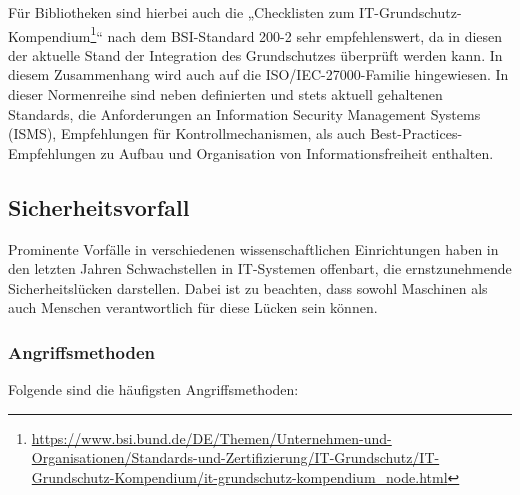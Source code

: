 \documentclass[
  11pt,
  letterpaper,
  DIV=11,
  twoside]{scrreprt}
\DeclareRobustCommand{\href}[2]{#2\footnote{\url{#1}}}
\begin{document}
Für Bibliotheken sind hierbei auch die „Checklisten zum
\href{https://www.bsi.bund.de/DE/Themen/Unternehmen-und-Organisationen/Standards-und-Zertifizierung/IT-Grundschutz/IT-Grundschutz-Kompendium/it-grundschutz-kompendium_node.html}{IT-Grundschutz-Kompendium}``
nach dem BSI-Standard 200-2 sehr empfehlenswert, da in diesen der
aktuelle Stand der Integration des Grundschutzes überprüft werden kann.
In diesem Zusammenhang wird auch auf die ISO/IEC-27000-Familie
hingewiesen. In dieser Normenreihe sind neben definierten und stets
aktuell gehaltenen Standards, die Anforderungen an Information Security
Management Systems (ISMS), Empfehlungen für Kontrollmechanismen, als
auch Best-Practices-Empfehlungen zu Aufbau und Organisation von
Informationsfreiheit enthalten.

\subsection{Sicherheitsvorfall}\label{sec-sicherheitsvorfall}

Prominente Vorfälle in verschiedenen wissenschaftlichen Einrichtungen
haben in den letzten Jahren Schwachstellen in IT-Systemen offenbart, die
ernstzunehmende Sicherheitslücken darstellen. Dabei ist zu beachten,
dass sowohl Maschinen als auch Menschen verantwortlich für diese Lücken
sein können.

\subsubsection{Angriffsmethoden}\label{angriffsmethoden}

Folgende sind die häufigsten Angriffsmethoden:
\end{document}
